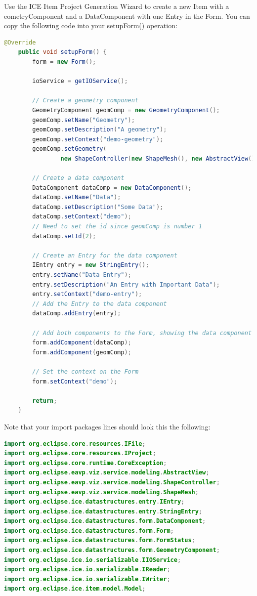 \documentclass{article}
\begin{document}
Use the ICE Item Project Generation Wizard to create a new Item with  a
eometryComponent and a DataComponent with one Entry in the Form. You can copy
the following code into your setupForm() operation:

\begin{lstlisting}[language=java]
@Override
    public void setupForm() {
        form = new Form();

        ioService = getIOService();

        // Create a geometry component
        GeometryComponent geomComp = new GeometryComponent();
        geomComp.setName("Geometry");
        geomComp.setDescription("A geometry");
        geomComp.setContext("demo-geometry");
        geomComp.setGeometry(
                new ShapeController(new ShapeMesh(), new AbstractView()));

        // Create a data component
        DataComponent dataComp = new DataComponent();
        dataComp.setName("Data");
        dataComp.setDescription("Some Data");
        dataComp.setContext("demo");
        // Need to set the id since geomComp is number 1
        dataComp.setId(2);

        // Create an Entry for the data component
        IEntry entry = new StringEntry();
        entry.setName("Data Entry");
        entry.setDescription("An Entry with Important Data");
        entry.setContext("demo-entry");
        // Add the Entry to the data component
        dataComp.addEntry(entry);

        // Add both components to the Form, showing the data component first.
        form.addComponent(dataComp);
        form.addComponent(geomComp);

        // Set the context on the Form
        form.setContext("demo");

        return;
    }
\end{lstlisting}

Note that your import packages lines should look this the following:

\begin{lstlisting}[language=java]
import org.eclipse.core.resources.IFile;
import org.eclipse.core.resources.IProject;
import org.eclipse.core.runtime.CoreException;
import org.eclipse.eavp.viz.service.modeling.AbstractView;
import org.eclipse.eavp.viz.service.modeling.ShapeController;
import org.eclipse.eavp.viz.service.modeling.ShapeMesh;
import org.eclipse.ice.datastructures.entry.IEntry;
import org.eclipse.ice.datastructures.entry.StringEntry;
import org.eclipse.ice.datastructures.form.DataComponent;
import org.eclipse.ice.datastructures.form.Form;
import org.eclipse.ice.datastructures.form.FormStatus;
import org.eclipse.ice.datastructures.form.GeometryComponent;
import org.eclipse.ice.io.serializable.IIOService;
import org.eclipse.ice.io.serializable.IReader;
import org.eclipse.ice.io.serializable.IWriter;
import org.eclipse.ice.item.model.Model;
\end{lstlisting}
\end{document}
